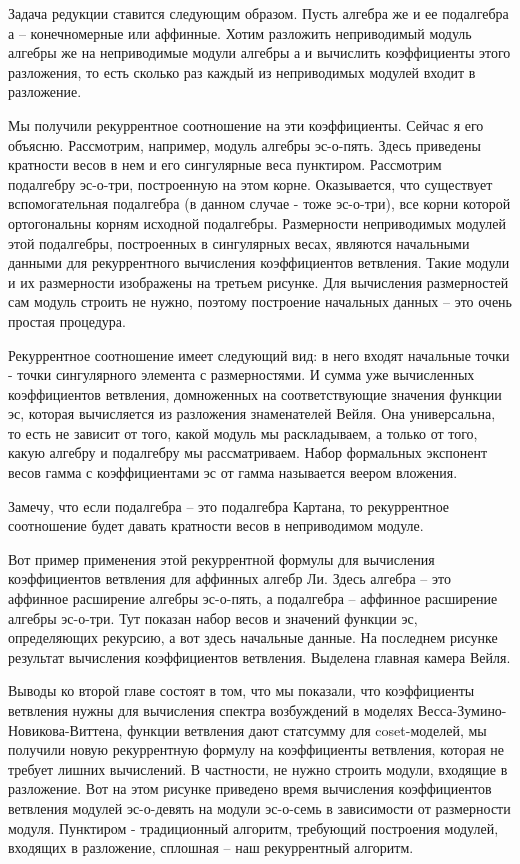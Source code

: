 \documentclass{article}
\theoremstyle{definition} \newtheorem{Def}{Определение}
\begin{document}
Задача редукции ставится следующим образом. Пусть алгебра же и ее подалгебра а -- конечномерные или аффинные. Хотим разложить неприводимый модуль алгебры же на неприводимые модули алгебры а и вычислить коэффициенты этого разложения, то есть сколько раз каждый из неприводимых модулей входит в разложение. 

Мы получили рекуррентное соотношение на эти коэффициенты. Сейчас я его объясню. 
Рассмотрим, например, модуль алгебры эс-о-пять. Здесь приведены кратности весов в нем и его сингулярные веса пунктиром. Рассмотрим подалгебру эс-о-три, построенную на этом корне. Оказывается, что существует вспомогательная подалгебра (в данном случае - тоже эс-о-три), все корни которой ортогональны корням исходной подалгебры. Размерности неприводимых модулей этой подалгебры, построенных в сингулярных весах, являются начальными данными для рекуррентного вычисления коэффициентов ветвления. Такие модули и их размерности изображены на третьем рисунке. Для вычисления размерностей сам модуль строить не нужно, поэтому построение начальных данных -- это очень простая процедура. 

Рекуррентное соотношение имеет следующий вид: в него входят начальные точки - точки сингулярного элемента с размерностями. И сумма уже вычисленных коэффициентов ветвления, домноженных на соответствующие значения функции эс, которая вычисляется из разложения знаменателей Вейля. Она универсальна, то есть не зависит от того, какой модуль мы раскладываем, а только от того, какую алгебру и подалгебру мы рассматриваем. Набор формальных экспонент весов гамма с коэффициентами эс от гамма называется веером вложения.

Замечу, что если подалгебра -- это подалгебра Картана, то рекуррентное соотношение будет давать кратности весов в неприводимом модуле.

Вот пример применения этой рекуррентной формулы для вычисления коэффициентов ветвления для аффинных алгебр Ли. Здесь алгебра -- это аффинное расширение алгебры эс-о-пять, а подалгебра -- аффинное расширение алгебры эс-о-три. Тут показан набор весов и значений функции эс, определяющих рекурсию, а вот здесь начальные данные. На последнем рисунке результат вычисления коэффициентов ветвления. Выделена главная камера Вейля. 

Выводы ко второй главе состоят в том, что мы показали, что коэффициенты ветвления нужны для вычисления спектра возбуждений в моделях Весса-Зумино-Новикова-Виттена, функции ветвления дают статсумму для coset-моделей, мы получили новую рекуррентную формулу на коэффициенты ветвления, которая не требует лишних вычислений. В частности, не нужно строить модули, входящие в разложение. Вот на этом рисунке приведено время вычисления коэффициентов ветвления модулей эс-о-девять на модули эс-о-семь в зависимости от размерности модуля. Пунктиром - традиционный алгоритм, требующий построения модулей, входящих в разложение, сплошная -- наш рекуррентный алгоритм. 
\end{document}
